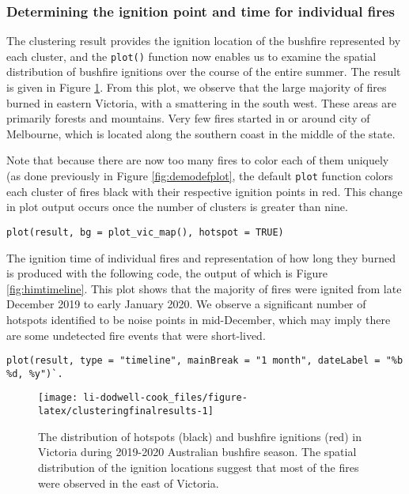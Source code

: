 \hypertarget{determining-the-ignition-point-and-time-for-individual-fires}{%
\subsubsection{Determining the ignition point and time for individual fires}\label{determining-the-ignition-point-and-time-for-individual-fires}}

The clustering result provides the ignition location of the bushfire represented by each cluster, and the \texttt{plot()} function now enables us to examine the spatial distribution of bushfire ignitions over the course of the entire summer. The result is given in Figure \ref{fig:clusteringfinalresults}. From this plot, we observe that the large majority of fires burned in eastern Victoria, with a smattering in the south west. These areas are primarily forests and mountains. Very few fires started in or around city of Melbourne, which is located along the southern coast in the middle of the state.

Note that because there are now too many fires to color each of them uniquely (as done previously in Figure \ref{fig:demodefplot}, the default \texttt{plot} function colors each cluster of fires black with their respective ignition points in red. This change in plot output occurs once the number of clusters is greater than nine.

\begin{verbatim}
plot(result, bg = plot_vic_map(), hotspot = TRUE)
\end{verbatim}

The ignition time of individual fires and representation of how long they burned is produced with the following code, the output of which is Figure \ref{fig:himtimeline}. This plot shows that the majority of fires were ignited from late December 2019 to early January 2020. We observe a significant number of hotspots identified to be noise points in mid-December, which may imply there are some undetected fire events that were short-lived.

\begin{verbatim}
plot(result, type = "timeline", mainBreak = "1 month", dateLabel = "%b %d, %y")`. 
\end{verbatim}

\begin{figure}

{\centering \texttt{[image: li-dodwell-cook\_files/figure-latex/clusteringfinalresults-1]} 

}

\caption{ The distribution of hotspots (black) and bushfire ignitions (red) in Victoria during 2019-2020 Australian bushfire season. The spatial distribution of the ignition locations suggest that most of the fires were observed in the east of Victoria.}\label{fig:clusteringfinalresults}
\end{figure}

